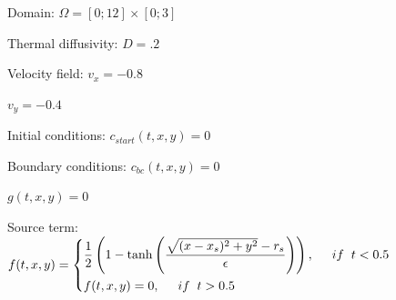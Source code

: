 \documentclass[12pt]{article}
\begin{document}
\hspace{2.7cm}Domain:\hspace{1.2cm} $\Omega = [0;12] \times [0;3]$

\hspace{.65cm}Thermal diffusivity: \hspace{1cm} $D = .2$

\hspace{1.77cm}Velocity field: \hspace{1.5cm} $v_x = -0.8$

\hspace{5.5cm} $v_y = -0.4$

\hspace{1.05cm}Initial conditions: \hspace{1cm} $c_{start}(t,x,y) = 0$

\hspace{.24cm} Boundary conditions: \hspace{1cm} $c_{bc}(t,x,y) = 0$

\hspace{5.5cm} $g(t,x,y) = 0$

\hspace{1.83cm} Source term: \hspace{1cm} $f(t,x,y) = \begin{equation*}
\begin{dcases}
\frac{1}{2}\left(1-\tanh \left( \frac{\sqrt{(x-x_s)^2+y^2}-r_s}{\epsilon}\right)\right), \hspace{.5cm}if\hspace{.2cm} t<0.5\\
f(t,x,y) = 0, \hspace{.5cm}if\hspace{.2cm} t>0.5
\end{dcases}
\end{equation*}$
\\
\end{document}
